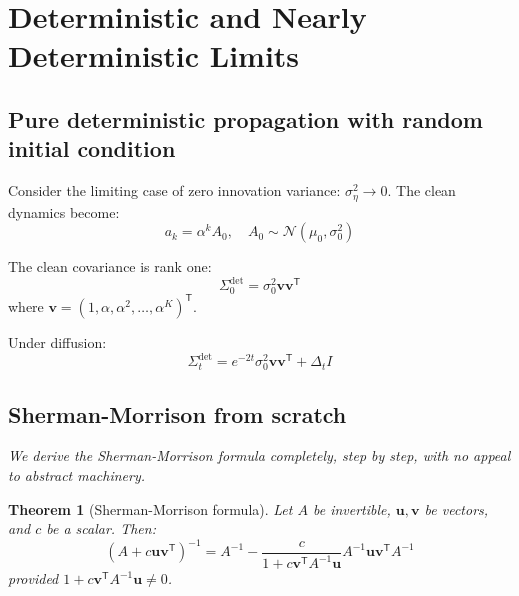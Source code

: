 \documentclass[11pt,a4paper]{article}
\theoremstyle{plain}
\newtheorem{theorem}{Theorem}[section]
\theoremstyle{definition}
\newcommand{\Sig}{\Sigma}
\newcommand{\delt}{\Delta_t}
\newcommand{\vct}[1]{\mathbf{#1}}
\newcommand{\tr}{\mathsf{T}}
\begin{document}
\section{Deterministic and Nearly Deterministic Limits}
\label{sec:deterministic}

\subsection{Pure deterministic propagation with random initial condition}
\label{sec:det-propagation}

Consider the limiting case of zero innovation variance: $\sigma_\eta^2 \to 0$. The clean dynamics become:
\begin{equation}
a_k = \alpha^k A_0, \quad A_0 \sim \mathcal{N}(\mu_0, \sigma_0^2)
\end{equation}

The clean covariance is rank one:
\begin{equation}
\Sig_0^{\text{det}} = \sigma_0^2 \vct{v} \vct{v}^\tr
\end{equation}
where $\vct{v} = (1, \alpha, \alpha^2, \ldots, \alpha^K)^\tr$.

Under diffusion:
\begin{equation}
\Sig_t^{\text{det}} = e^{-2t}\sigma_0^2 \vct{v} \vct{v}^\tr + \delt I
\end{equation}

\subsection{Sherman-Morrison from scratch}
\label{sec:sherman-morrison}

\textit{We derive the Sherman-Morrison formula completely, step by step, with no appeal to abstract machinery.}

\begin{theorem}[Sherman-Morrison formula]
Let $A$ be invertible, $\vct{u}, \vct{v}$ be vectors, and $c$ be a scalar. Then:
\begin{equation}
(A + c \vct{u} \vct{v}^\tr)^{-1} = A^{-1} - \frac{c}{1 + c \vct{v}^\tr A^{-1} \vct{u}} A^{-1} \vct{u} \vct{v}^\tr A^{-1}
\end{equation}
provided $1 + c \vct{v}^\tr A^{-1} \vct{u} \ne 0$.
\end{theorem}
\end{document}

